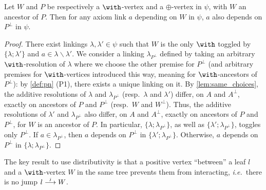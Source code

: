 \documentclass{lmcs}
\newcommand*{\orth}{^\perp} %
\newcommand*{\ie}{\emph{i.e.}}
\newcommand*{\resp}{resp.}
\newcommand{\symboltext}[2]{\mathrel{\overset{\makebox[0pt]{\mbox{\normalfont\tiny\sffamily \ensuremath{#1}}}}{#2}}} %
\newcommand{\jump}{\symboltext{j}{\longrightarrow}}
\begin{document}
\begin{lem}
\label{lem:desc_jump_plus}
Let $W$ and $P$ be respectively a $\with$-vertex and a $\oplus$-vertex in $\psi$, with $W$ an ancestor of $P$.
Then for any axiom link $a$ depending on $W$ in $\psi$, $a$ also depends on $P\orth$ in $\psi$.
\end{lem}
\begin{proof}
There exist linkings $\lambda,\lambda'\in\psi$ such that $W$ is the only $\with$ toggled by $\{\lambda;\lambda'\}$ and $a\in\lambda\backslash\lambda'$.
We consider a linking $\lambda_{P\orth}$ defined by taking an arbitrary $\with$-resolution of $\lambda$ where we choose the other premise for $P\orth$ (and arbitrary premises for $\with$-vertices introduced this way, meaning for $\with$-ancestors of $P\orth$): by \autoref{def:pn} (P1), there exists a unique linking on it.
By \autoref{lem:same_choices}, the additive resolutions of $\lambda$ and $\lambda_{P\orth}$ (\resp\ $\lambda$ and $\lambda'$) differ, on $A$ and $A\orth$, exactly on ancestors of $P$ and $P\orth$ (\resp\ $W$ and $W\orth$). Thus, the additive resolutions of $\lambda'$ and $\lambda_{P\orth}$ also differ, on $A$ and $A\orth$, exactly on ancestors of $P$ and $P\orth$, for $W$ is an ancestor of $P$.
In particular, $\{\lambda;\lambda_{P\orth}\}$, as well as $\{\lambda';\lambda_{P\orth}\}$, toggles only $P\orth$.
If $a\in\lambda_{P\orth}$, then $a$ depends on $P\orth$ in $\{\lambda';\lambda_{P\orth}\}$.
Otherwise, $a$ depends on $P\orth$ in $\{\lambda;\lambda_{P\orth}\}$.
\end{proof}

The key result to use distributivity is that a positive vertex ``between'' a leaf $l$ and a $\with$-vertex $W$ in the same tree prevents them from interacting, \ie\ there is no jump $l\jump W$.
\end{document}

